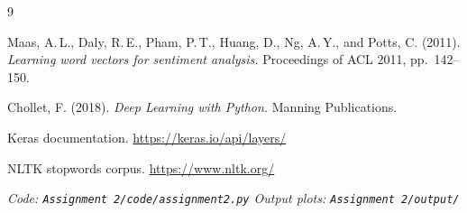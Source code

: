 \documentclass[12pt,a4paper]{article}
\begin{document}
\begin{thebibliography}{9}

  Maas, A.\,L., Daly, R.\,E., Pham, P.\,T., Huang, D., Ng, A.\,Y., and
  Potts, C. (2011). \textit{Learning word vectors for sentiment analysis.}
  Proceedings of ACL 2011, pp.\ 142--150.

  Chollet, F. (2018). \textit{Deep Learning with Python.} Manning Publications.

  Keras documentation. \url{https://keras.io/api/layers/}

  NLTK stopwords corpus. \url{https://www.nltk.org/}

\end{thebibliography}

\vspace{1em}
\noindent\small\textit{Code: \texttt{Assignment 2/code/assignment2.py} \quad
Output plots: \texttt{Assignment 2/output/}}
\end{document}
